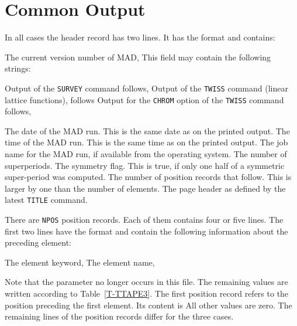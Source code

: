 \section{Common Output}
In all cases the header record has two lines.
It has the format
and contains:
\begin{mylist}
The current version number of MAD,
This field may contain the following strings:
\begin{mylist}
Output of the {\tt SURVEY} command follows,
Output of the {\tt TWISS} command (linear lattice functions),
follows
Output for the {\tt CHROM} option of the {\tt TWISS} command follows,
\end{mylist}
The date of the MAD run.
This is the same date as on the printed output.
The time of the MAD run.
This is the same time as on the printed output.
The job name for the MAD run, if available from the operating system.
The number of superperiods.
The symmetry flag.
This is true,
if only one half of a symmetric super-period was computed.
The number of position records that follow.
This is larger by one than the number of elements.
The page header as defined by the latest {\tt TITLE} command.
\end{mylist}
There are {\tt NPOS} position records.
Each of them contains four or five lines.
The first two lines have the format
and contain the following information about the preceding element:
\begin{mylist}
The element keyword,
The element name,
\end{mylist}
Note that the  parameter no longer occurs in this file.
The remaining values are written according to Table~\ref{T-TTAPE3}.
The first position record refers to the position preceding
the first element.
Its content is
All other values are zero.
The remaining lines of the position records differ for the three cases.

